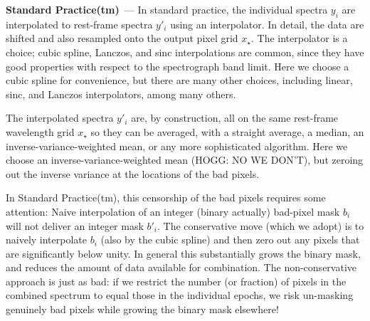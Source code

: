\documentclass[modern]{aastex631}
\renewcommand{\paragraph}[1]{\medskip\par\noindent\textbf{#1}~---}
\begin{document}
\paragraph{Standard Practice(tm)}
In standard practice, the individual spectra $y_i$ are interpolated to rest-frame spectra $y'_i$ using an interpolator.
In detail, the data are shifted and also resampled onto the output pixel grid $x_\star$.
The interpolator is a choice; cubic spline, Lanczos, and sinc interpolations are common, since they have good properties with respect to the spectrograph band limit.
Here we choose a cubic spline for convenience, but there are many other choices, including linear, sinc, and Lanczos interpolators, among many others.

The interpolated spectra $y'_i$ are, by construction, all on the same rest-frame wavelength grid $x_\star$ so they can be averaged, with a straight average, a median, an inverse-variance-weighted mean, or any more sophisticated algorithm.
Here we choose an inverse-variance-weighted mean (HOGG: NO WE DON'T), but zeroing out the inverse variance at the locations of the bad pixels.

In Standard Practice(tm), this censorship of the bad pixels requires some attention:
Naive interpolation of an integer (binary actually) bad-pixel mask $b_i$ will not deliver an integer mask $b'_i$.
The conservative move (which we adopt) is to naively interpolate $b_i$ (also by the cubic spline) and then zero out any pixels that are significantly below unity.
In general this substantially grows the binary mask, and reduces the amount of data available for combination.
The non-conservative approach is just as bad: if we restrict the number (or fraction) of pixels in the combined spectrum to equal those in the individual epochs, we risk un-masking genuinely bad pixels while growing the binary mask elsewhere!
\end{document}
